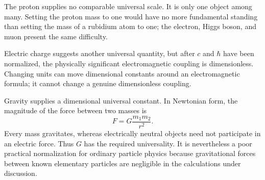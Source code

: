 The proton supplies no comparable universal scale. It is only one object among many. Setting the proton mass to one would have no more fundamental standing than setting the mass of a rubidium atom to one; the electron, Higgs boson, and muon present the same difficulty.

Electric charge suggests another universal quantity, but after \(c\) and \(\hbar\) have been normalized, the physically significant electromagnetic coupling is dimensionless. Changing units can move dimensional constants around an electromagnetic formula; it cannot change a genuine dimensionless coupling.

Gravity supplies a dimensional universal constant. In Newtonian form, the magnitude of the force between two masses is
\begin{equation}
F=G\frac{m_1m_2}{r^2}.
\end{equation}
Every mass gravitates, whereas electrically neutral objects need not participate in an electric force. Thus \(G\) has the required universality. It is nevertheless a poor practical normalization for ordinary particle physics because gravitational forces between known elementary particles are negligible in the calculations under discussion.

\begin{classroomqa}
\end{classroomqa}

\begin{classroomqa}
\end{classroomqa}

